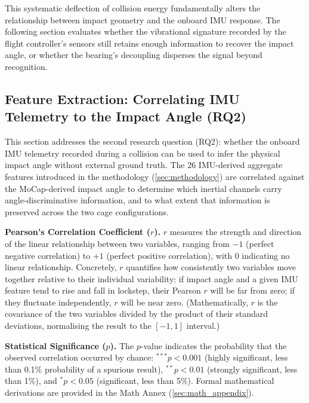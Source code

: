 This systematic deflection of collision energy fundamentally alters the relationship between impact geometry and the onboard IMU response. The following section evaluates whether the vibrational signature recorded by the flight controller's sensors still retains enough information to recover the impact angle, or whether the bearing's decoupling disperses the signal beyond recognition.

\clearpage

\subsection{Feature Extraction: Correlating IMU Telemetry to the Impact Angle (RQ2)}
\label{sec:result_analysis}

This section addresses the second research question (RQ2): whether the onboard IMU telemetry recorded during a collision can be used to infer the physical impact angle without external ground truth. The 26 IMU-derived aggregate features introduced in the methodology (\autoref{sec:methodology}) are correlated against the MoCap-derived impact angle to determine which inertial channels carry angle-discriminative information, and to what extent that information is preserved across the two cage configurations.



\begin{tcolorbox}[breakable, colback=gray!8, colframe=black!30, arc=0pt,
    boxsep=10pt, left=4pt, right=4pt, top=4pt, bottom=4pt,
    before skip=6pt, after skip=6pt]
\textbf{Pearson's Correlation Coefficient ($r$).}
$r$ measures the strength and direction of the linear relationship between two variables, ranging from $-1$ (perfect negative correlation) to $+1$ (perfect positive correlation), with $0$ indicating no linear relationship. Concretely, $r$ quantifies how consistently two variables move together relative to their individual variability: if impact angle and a given IMU feature tend to rise and fall in lockstep, their Pearson $r$ will be far from zero; if they fluctuate independently, $r$ will be near zero. (Mathematically, $r$ is the covariance of the two variables divided by the product of their standard deviations, normalising the result to the $[-1,1]$ interval.)

\textbf{Statistical Significance ($p$).}
The $p$-value indicates the probability that the observed correlation occurred by chance: $^{***} p < 0.001$ (highly significant, less than 0.1\% probability of a spurious result), $^{**} p < 0.01$ (strongly significant, less than 1\%), and $^{*} p < 0.05$ (significant, less than 5\%). Formal mathematical derivations are provided in the Math Annex (\autoref{sec:math_appendix}).
\end{tcolorbox}

